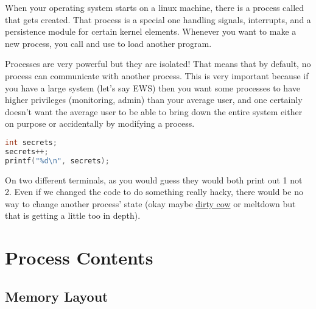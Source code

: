 When your operating system starts on a linux machine, there is a process called  that gets created. That process is a special one handling signals, interrupts, and a persistence module for certain kernel elements. Whenever you want to make a new process, you call  and use  to load another program.

Processes are very powerful but they are isolated! That means that by default, no process can communicate with another process. This is very important because if you have a large system (let's say EWS) then you want some processes to have higher privileges (monitoring, admin) than your average user, and one certainly doesn't want the average user to be able to bring down the entire system either on purpose or accidentally by modifying a process.

\begin{lstlisting}[language=C]
int secrets;
secrets++;
printf("%d\n", secrets);
\end{lstlisting}

On two different terminals, as you would guess they would both print out 1 not 2. Even if we changed the code to do something really hacky, there would be no way to change another process' state (okay maybe \href{https://en.wikipedia.org/wiki/Dirty_COW}{dirty cow} or meltdown but that is getting a little too in depth).

\section{Process Contents}\label{process-contents}

\subsection{Memory Layout}\label{memory-layout}

